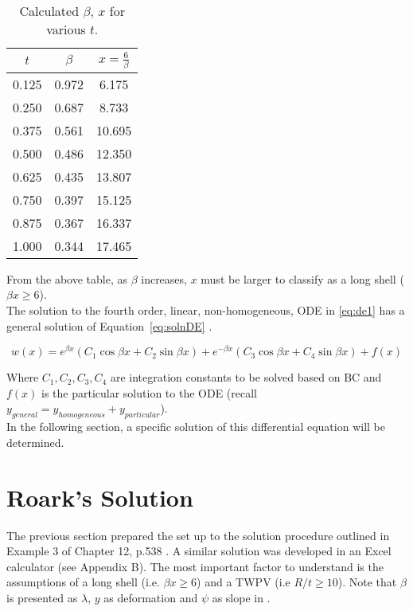 \begin{table}[H]
  \centering
  \caption{Calculated $\beta$, $x$ for various $t$.}
    \begin{tabular}{ccc}
    \textbf{$t$} & \textbf{$\beta$} & \textbf{$x=\tfrac{6}{\beta}$}\\
    \hline
    0.125 & 0.972 & 6.175 \\
    0.250 & 0.687 & 8.733 \\
    0.375 & 0.561 & 10.695 \\
    0.500 & 0.486 & 12.350 \\
    0.625 & 0.435 & 13.807 \\
    0.750 & 0.397 & 15.125 \\
    0.875 & 0.367 & 16.337 \\
    1.000 & 0.344 & 17.465 \\
    \end{tabular}%
  \label{table:3_beta}
\end{table}

From the above table, as $\beta$ increases, $x$ must be larger to classify as a long shell ($\beta x \geq 6$).\\


The solution to the fourth order, linear, non-homogeneous, ODE in \ref{eq:de1} has a general solution of Equation~\ref{eq:solnDE} \cite{timoshenko1959theory}.

\begin{equation}
	\label{eq:solnDE}
	w(x)=e^{\beta x} \left(C_1 \cos \beta x +C_2 \sin \beta x \right)+e^{-\beta x} \left(C_3 \cos \beta x +C_4 \sin \beta x \right) +f(x)
\end{equation}

Where $ C_1, C_2, C_3, C_4$ are integration constants to be solved based on BC and $f(x)$ is the particular solution to the ODE (recall $y_{general}=y_{homogeneous}+y_{particular}$).\\

In the following section, a specific solution of this differential equation will be determined.


\section{Roark's Solution}
\label{section:3_roark}

The previous section prepared the set up to the solution procedure outlined in Example 3 of Chapter 12, p.538 \cite{roarks}. A similar solution was developed in an Excel \cite{EXCEL} calculator (see Appendix B). The most important factor to understand is the assumptions of a long shell (i.e. $\beta x \geq 6$) and a TWPV (i.e $R/t \geq 10$). Note that $\beta$ is presented as $\lambda$, $y$ as deformation and $\psi$ as slope in \cite{roarks}.\\

